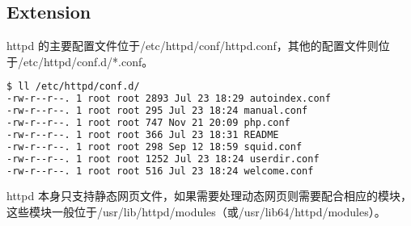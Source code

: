 \subsection{Extension}

httpd 的主要配置文件位于/etc/httpd/conf/httpd.conf，其他的配置文件则位于/etc/httpd/conf.d/*.conf。


\begin{lstlisting}[language=bash]
$ ll /etc/httpd/conf.d/
-rw-r--r--. 1 root root 2893 Jul 23 18:29 autoindex.conf
-rw-r--r--. 1 root root 295 Jul 23 18:24 manual.conf
-rw-r--r--. 1 root root 747 Nov 21 20:09 php.conf
-rw-r--r--. 1 root root 366 Jul 23 18:31 README
-rw-r--r--. 1 root root 298 Sep 12 18:59 squid.conf
-rw-r--r--. 1 root root 1252 Jul 23 18:24 userdir.conf
-rw-r--r--. 1 root root 516 Jul 23 18:24 welcome.conf
\end{lstlisting}


httpd 本身只支持静态网页文件，如果需要处理动态网页则需要配合相应的模块，这些模块一般位于/usr/lib/httpd/modules（或/usr/lib64/httpd/modules）。


